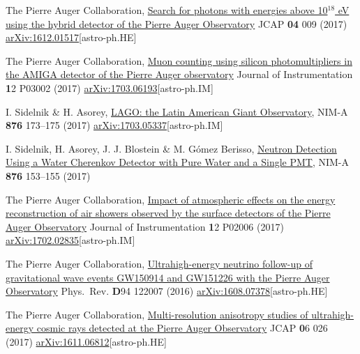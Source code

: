 \begin{etaremune}
\item {}The Pierre Auger Collaboration, \href{https://doi.org/10.1088/1475-7516/2017/04/009}{{Search for photons with energies above 10$^{18}$ eV using the hybrid detector of the Pierre Auger Observatory}} JCAP {\textbf{04}} 009 (2017) \href{http://arxiv.org/abs/1612.01517}{arXiv:1612.01517}[astro-ph.HE]

\item {}The Pierre Auger Collaboration, \href{https://doi.org/10.1088/1748-0221/12/03/P03002}{{Muon counting using silicon photomultipliers in the AMIGA detector of the Pierre Auger observatory}} Journal of Instrumentation {\textbf 12} P03002 (2017) \href{http://arxiv.org/abs/1703.06193}{arXiv:1703.06193}[astro-ph.IM]

\item {}I. Sidelnik \& H. Asorey, \href{https://doi.org/10.1016/j.nima.2017.02.069}{{LAGO: the Latin American Giant Observatory}}, NIM-A {\textbf{876}} 173--175 (2017) \href{http://arxiv.org/abs/1703.05337}{arXiv:1703.05337}[astro-ph.IM]

\item {} I. Sidelnik, H. Asorey, J. J. Blostein \& M. Gómez Berisso, \href{https://doi.org/10.1016/j.nima.2017.02.048}{{Neutron Detection Using a Water Cherenkov Detector with Pure Water and a Single PMT}}, NIM-A {\textbf{876}} 153--155 (2017)

\item {}The Pierre Auger Collaboration, \href{https://doi.org/10.1088/1748-0221/12/02/P02006}{{Impact of atmospheric effects on the energy reconstruction of air showers observed by the surface detectors of the Pierre Auger Observatory}} Journal of Instrumentation {\textbf 12} P02006 (2017) \href{http://arxiv.org/abs/1702.02835}{arXiv:1702.02835}[astro-ph.IM]

\item {}The Pierre Auger Collaboration, \href{https://doi.org/10.1103/PhysRevD.94.122007}{{Ultrahigh-energy neutrino follow-up of gravitational wave events GW150914 and GW151226 with the Pierre Auger Observatory}} Phys.\ Rev. {\textbf D94} 122007 (2016) \href{http://arxiv.org/abs/1608.07378}{arXiv:1608.07378}[astro-ph.HE]

\item {}The Pierre Auger Collaboration, \href{https://doi.org/10.1088/1475-7516/2017/06/026}{{Multi-resolution anisotropy studies of ultrahigh-energy cosmic rays detected at the Pierre Auger Observatory}} JCAP {\textbf 06} 026 (2017) \href{http://arxiv.org/abs/1611.06812}{arXiv:1611.06812}[astro-ph.HE]


\end{etaremune}
